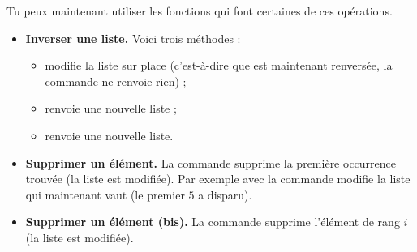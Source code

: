 \documentclass[11pt,class=report,crop=false]{standalone}
\begin{document}
\begin{cours}
  Tu peux maintenant utiliser les fonctions \Python{} qui font certaines de ces opérations.
  
\begin{itemize}
  \item \textbf{Inverser une liste.} Voici trois méthodes :
\begin{itemize}
  \item {} modifie la liste sur place (c'est-à-dire que  est maintenant renversée, la commande ne renvoie rien) ;
  \item {} renvoie une nouvelle liste ;
  \item {} renvoie une nouvelle liste. 
\end{itemize}  

  \item \textbf{Supprimer un élément.}  La commande  supprime la première occurrence trouvée (la liste est modifiée). Par exemple avec  la commande  modifie la liste qui maintenant vaut \ci{[2,3,8,5]} (le premier $5$ a disparu).
  
   \item \textbf{Supprimer un élément (bis).}  La commande  supprime l'élément de rang $i$ (la liste est modifiée).
  
\end{itemize}
\end{cours}



\end{document}
